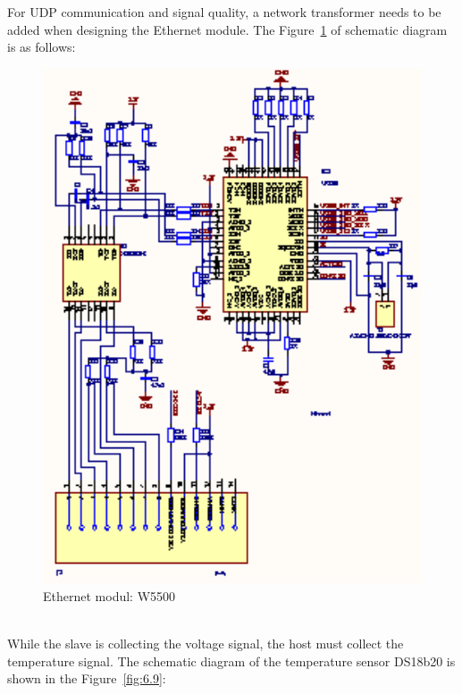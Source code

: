 For UDP communication and signal quality, a network transformer needs to be added when designing the Ethernet module. The Figure~\ref{fig:6.8} of schematic diagram is as follows:
 
\begin{figure}[!ht]
	\centering
	\includegraphics[width=16cm]{grafiken/w5500.eps}
	\caption{Ethernet modul: W5500} 
	\label{fig:6.8}
\end{figure}
\FloatBarrier
\\
While the slave is collecting the voltage signal, the host must collect the temperature signal. The schematic diagram of the temperature sensor DS18b20 is shown in the Figure~\ref{fig:6.9}:

